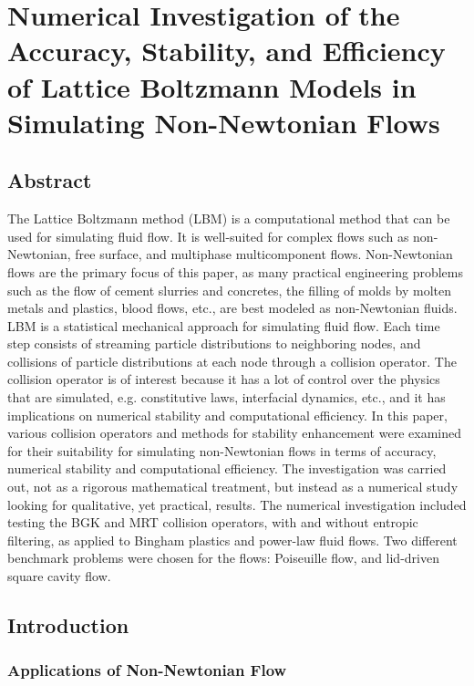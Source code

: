 \documentclass[pdftex,ms]{pittetd}
\begin{document}
\chapter{Numerical Investigation of the Accuracy, Stability, and Efficiency of Lattice Boltzmann Models in Simulating Non-Newtonian Flows} \label{cha:lbm-stability}

\section*{Abstract}

The Lattice Boltzmann method (LBM) is a computational method that can be used for simulating fluid flow.
It is well-suited for complex flows such as non-Newtonian, free surface, and multiphase multicomponent flows.
Non-Newtonian flows are the primary focus of this paper, as many practical engineering problems such as the flow of cement slurries and concretes, the filling of molds by molten metals and plastics, blood flows, etc., are best modeled as non-Newtonian fluids.
LBM is a statistical mechanical approach for simulating fluid flow.
Each time step consists of streaming particle distributions to neighboring nodes, and collisions of particle distributions at each node through a collision operator.
The collision operator is of interest because it has a lot of control over the physics that are simulated, e.g. constitutive laws, interfacial dynamics, etc., and it has implications on numerical stability and computational efficiency.
In this paper, various collision operators and methods for stability enhancement were examined for their suitability for simulating non-Newtonian flows in terms of accuracy, numerical stability and computational efficiency.
The investigation was carried out, not as a rigorous mathematical treatment, but instead as a numerical study looking for qualitative, yet practical, results.
The numerical investigation included testing the BGK and MRT collision operators, with and without entropic filtering, as applied to Bingham plastics and power-law fluid flows.
Two different benchmark problems were chosen for the flows: Poiseuille flow, and lid-driven square cavity flow.

\section{Introduction} %

\subsection{Applications of Non-Newtonian Flow}
\end{document}
